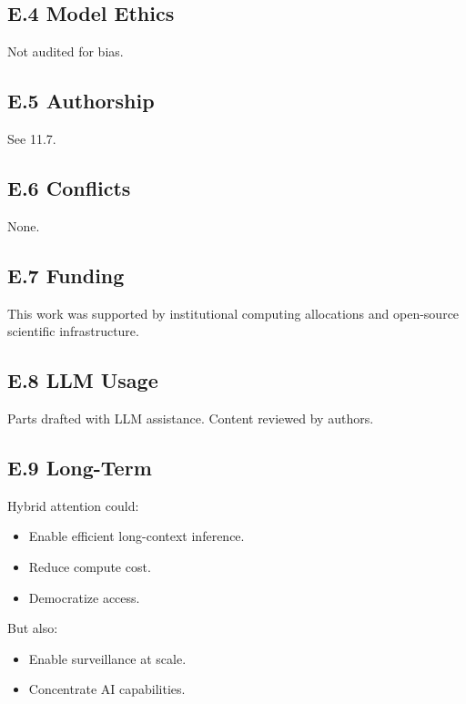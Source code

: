 \subsection{E.4 Model Ethics}

Not audited for bias.

\subsection{E.5 Authorship}

See  11.7.

\subsection{E.6 Conflicts}

None.

\subsection{E.7 Funding}

This work was supported by institutional computing allocations and open-source scientific infrastructure.

\subsection{E.8 LLM Usage}

Parts drafted with LLM assistance. Content reviewed by authors.

\subsection{E.9 Long-Term}

Hybrid attention could:
\begin{itemize}
\item Enable efficient long-context inference.
\item Reduce compute cost.
\item Democratize access.

\end{itemize}
But also:
\begin{itemize}
\item Enable surveillance at scale.
\item Concentrate AI capabilities.

\end{itemize}
